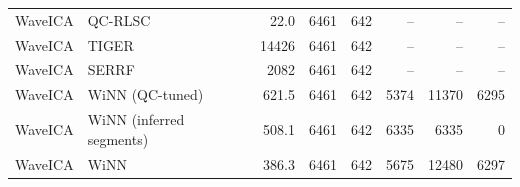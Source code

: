 \begin{landscape}
\begin{longtable}{llrrrrrr}
WaveICA & QC-RLSC & 22.0 & 6461 & 642 & -- & -- & -- \\
WaveICA & TIGER & 14426 & 6461 & 642 & -- & -- & -- \\
WaveICA & SERRF & 2082 & 6461 & 642 & -- & -- & -- \\
WaveICA & WiNN (QC-tuned) & 621.5 & 6461 & 642 & 5374 & 11370 & 6295 \\
WaveICA & WiNN (inferred segments) & 508.1 & 6461 & 642 & 6335 & 6335 & 0 \\
WaveICA & WiNN & 386.3 & 6461 & 642 & 5675 & 12480 & 6297 \\
\end{longtable}
\end{landscape}
